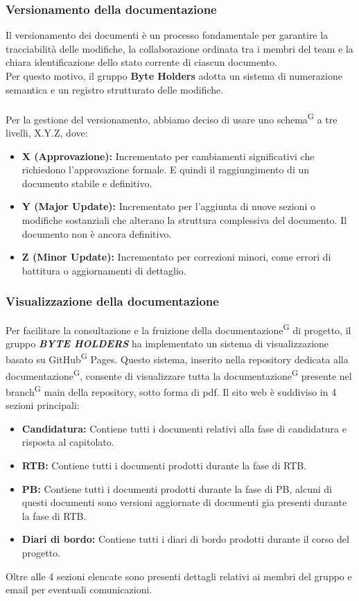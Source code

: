 \documentclass[a4paper, 11pt]{article}
\begin{document}
\subsubsection{Versionamento della documentazione}
Il versionamento dei documenti è un processo fondamentale per garantire la tracciabilità delle modifiche, la collaborazione ordinata tra i membri del team e la chiara identificazione dello stato corrente di ciascun documento. 
\\
Per questo motivo, il gruppo \textbf{Byte Holders} adotta un sistema di numerazione semantica e un registro strutturato delle modifiche.
\\
\\
Per la gestione del versionamento, abbiamo deciso di usare uno schema\textsuperscript{G} a tre livelli, X.Y.Z, dove:
\begin{itemize} 
    \item \textbf{X (Approvazione):} Incrementato per cambiamenti significativi che richiedono l'approvazione formale. E quindi il raggiungimento di un documento stabile e definitivo.
    \item \textbf{Y (Major Update):} Incrementato per l'aggiunta di nuove sezioni o modifiche sostanziali che alterano la struttura complessiva del documento. Il documento non è ancora definitivo.
    \item \textbf{Z (Minor Update):} Incrementato per correzioni minori, come errori di battitura o aggiornamenti di dettaglio.
\end{itemize}

\subsubsection{Visualizzazione della documentazione}
Per facilitare la consultazione e la fruizione della documentazione\textsuperscript{G} di progetto, il gruppo \textbf{\textit{BYTE HOLDERS}} ha implementato un sistema di visualizzazione basato su GitHub\textsuperscript{G} Pages.
Questo sistema, inserito nella repository dedicata alla documentazione\textsuperscript{G}, consente di visualizzare tutta la documentazione\textsuperscript{G} presente nel branch\textsuperscript{G} main della repository, sotto forma di pdf.
Il sito web è suddiviso in 4 sezioni principali:
\begin{itemize}
    \item \textbf{Candidatura:} Contiene tutti i documenti relativi alla fase di candidatura e risposta al capitolato.
    \item \textbf{RTB:} Contiene tutti i documenti prodotti durante la fase di RTB.
    \item \textbf{PB:} Contiene tutti i documenti prodotti durante la fase di PB, alcuni di questi documenti sono versioni aggiornate di documenti gia presenti durante la fase di RTB.
    \item \textbf{Diari di bordo:} Contiene tutti i diari di bordo prodotti durante il corso del progetto.
\end{itemize}
Oltre alle 4 sezioni elencate sono presenti dettagli relativi ai membri del gruppo e email per eventuali comunicazioni.
\end{document}
